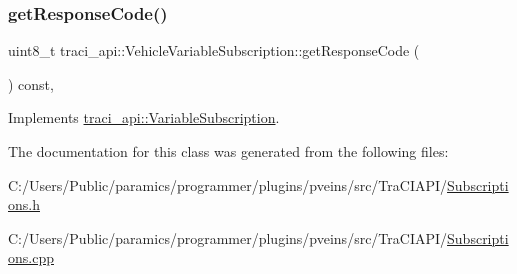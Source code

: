 \subsubsection{\texorpdfstring{get\+Response\+Code()}{getResponseCode()}}
{\footnotesize\ttfamily uint8\+\_\+t traci\+\_\+api\+::\+Vehicle\+Variable\+Subscription\+::get\+Response\+Code (\begin{DoxyParamCaption}{ }\end{DoxyParamCaption}) const\hspace{0.3cm}{\ttfamily [override]}, {\ttfamily [virtual]}}



Implements \hyperlink{classtraci__api_1_1_variable_subscription_a3e852072c435d02f96ff91f81506cef9}{traci\+\_\+api\+::\+Variable\+Subscription}.



The documentation for this class was generated from the following files\+:\begin{DoxyCompactItemize}
\item 
C\+:/\+Users/\+Public/paramics/programmer/plugins/pveins/src/\+Tra\+C\+I\+A\+P\+I/\hyperlink{_subscriptions_8h}{Subscriptions.\+h}\item 
C\+:/\+Users/\+Public/paramics/programmer/plugins/pveins/src/\+Tra\+C\+I\+A\+P\+I/\hyperlink{_subscriptions_8cpp}{Subscriptions.\+cpp}\end{DoxyCompactItemize}
